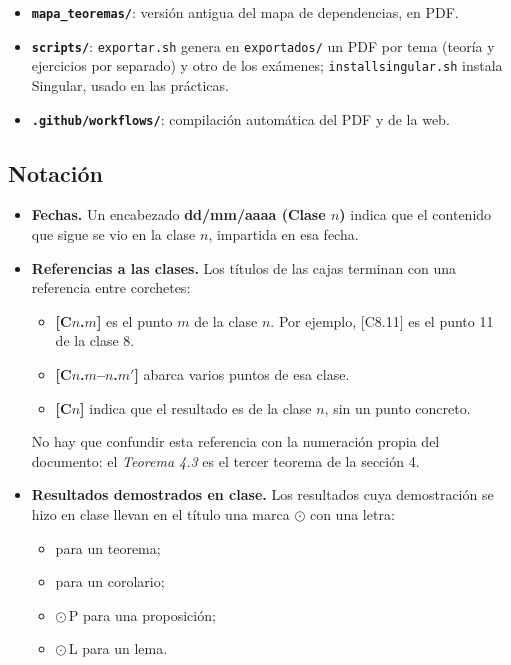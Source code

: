\begin{itemize}
    \item \textbf{\texttt{mapa\_teoremas/}}: versión antigua del mapa de dependencias, en PDF.
    \item \textbf{\texttt{scripts/}}: \texttt{exportar.sh} genera en \texttt{exportados/} un PDF por tema (teoría y ejercicios por separado) y otro de los exámenes; \texttt{installsingular.sh} instala Singular, usado en las prácticas.
    \item \textbf{\texttt{.github/workflows/}}: compilación automática del PDF y de la web.
\end{itemize}

\subsection*{Notación}
\begin{itemize}
    \item \textbf{Fechas.} Un encabezado \textbf{dd/mm/aaaa (Clase $n$)} indica que el contenido que sigue se vio en la clase $n$, impartida en esa fecha.
    \item \textbf{Referencias a las clases.} Los títulos de las cajas terminan con una referencia entre corchetes:
    \begin{itemize}
        \item \textbf{[C$n$.$m$]} es el punto $m$ de la clase $n$. Por ejemplo, [C8.11] es el punto 11 de la clase 8.
        \item \textbf{[C$n$.$m$–$n$.$m'$]} abarca varios puntos de esa clase.
        \item \textbf{[C$n$]} indica que el resultado es de la clase $n$, sin un punto concreto.
    \end{itemize}
    No hay que confundir esta referencia con la numeración propia del documento: el \emph{Teorema 4.3} es el tercer teorema de la sección 4.
    \item \textbf{Resultados demostrados en clase.} Los resultados cuya demostración se hizo en clase llevan en el título una marca $\odot$ con una letra:
    \begin{itemize}
        \item {} para un teorema;
        \item {} para un corolario;
        \item $\odot$\,P para una proposición;
        \item $\odot$\,L para un lema.

\end{itemize}
\end{itemize}
